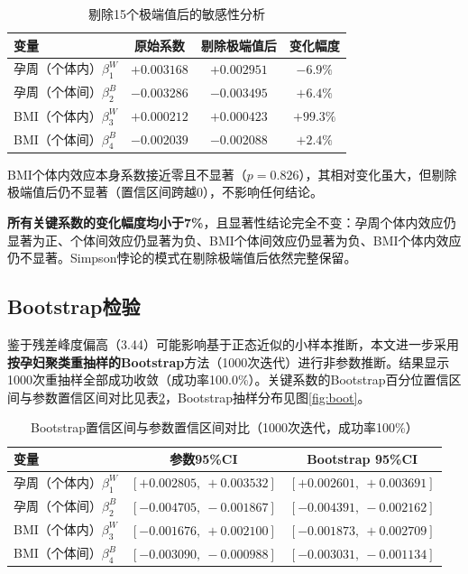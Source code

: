 \documentclass[12pt,a4paper]{ctexart}
\begin{document}
\begin{table}[htbp]
\centering
\caption{剔除15个极端值后的敏感性分析}
\label{tab:sens}
\begin{tabular}{lccc}
\toprule
变量 & 原始系数 & 剔除极端值后 & 变化幅度 \\
\midrule
孕周（个体内）$\beta_1^W$ & $+0.003168$ & $+0.002951$ & $-6.9\%$ \\
孕周（个体间）$\beta_2^B$ & $-0.003286$ & $-0.003495$ & $+6.4\%$ \\
BMI（个体内）$\beta_3^W$ & $+0.000212$ & $+0.000423$ & $+99.3\%$\tnote{a} \\
BMI（个体间）$\beta_4^B$ & $-0.002039$ & $-0.002088$ & $+2.4\%$ \\
\bottomrule
\end{tabular}
\begin{tablenotes}
\item[a] BMI个体内效应本身系数接近零且不显著（$p=0.826$），其相对变化虽大，但剔除极端值后仍不显著（置信区间跨越0），不影响任何结论。
\end{tablenotes}
\end{table}

\textbf{所有关键系数的变化幅度均小于7\%}，且显著性结论完全不变：孕周个体内效应仍显著为正、个体间效应仍显著为负、BMI个体间效应仍显著为负、BMI个体内效应仍不显著。Simpson悖论的模式在剔除极端值后依然完整保留。

\subsection{Bootstrap检验}

鉴于残差峰度偏高（3.44）可能影响基于正态近似的小样本推断，本文进一步采用\textbf{按孕妇聚类重抽样的Bootstrap}方法（1000次迭代）进行非参数推断。结果显示1000次重抽样全部成功收敛（成功率100.0\%）。关键系数的Bootstrap百分位置信区间与参数置信区间对比见表\ref{tab:boot}，Bootstrap抽样分布见图\ref{fig:boot}。

\begin{table}[htbp]
\centering
\caption{Bootstrap置信区间与参数置信区间对比（1000次迭代，成功率100\%）}
\label{tab:boot}
\begin{tabular}{lcc}
\toprule
变量 & 参数95\%CI & Bootstrap 95\%CI \\
\midrule
孕周（个体内）$\beta_1^W$ & $[+0.002805,\ +0.003532]$ & $[+0.002601,\ +0.003691]$ \\
孕周（个体间）$\beta_2^B$ & $[-0.004705,\ -0.001867]$ & $[-0.004391,\ -0.002162]$ \\
BMI（个体内）$\beta_3^W$ & $[-0.001676,\ +0.002100]$ & $[-0.001873,\ +0.002709]$ \\
BMI（个体间）$\beta_4^B$ & $[-0.003090,\ -0.000988]$ & $[-0.003031,\ -0.001134]$ \\
\bottomrule
\end{tabular}
\end{table}
\end{document}
